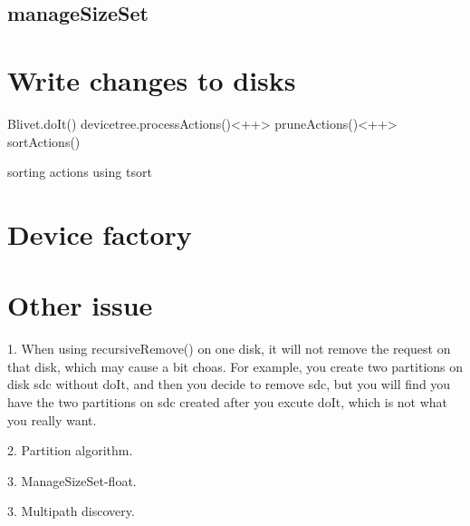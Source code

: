 \documentclass{article}
\begin{document}
\subsection{manageSizeSet}


\section{Write changes to disks}
Blivet.doIt()
devicetree.processActions()<++>
pruneActions()<++>
sortActions()

sorting actions using tsort

\section{Device factory}


\section{Other issue}
1. When using recursiveRemove() on one disk, it will not remove the request on
that disk, which may cause a bit choas. For example, you create two partitions
on disk sdc without doIt, and then you decide to remove sdc, but you will find
you have the two partitions on sdc created after you excute doIt, which is not
what you really want.

2. Partition algorithm.

3. ManageSizeSet-float.

3. Multipath discovery.
\end{document}

